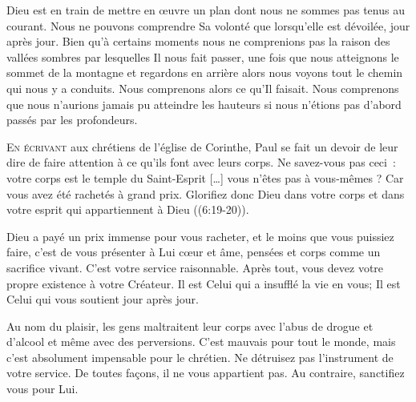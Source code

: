 Dieu est en train de mettre en \oe{}uvre un plan dont nous ne sommes
 pas tenus au courant. Nous ne pouvons comprendre Sa volonté
 que lorsqu'elle est dévoilée, jour après jour.
 Bien qu'à certains moments nous ne comprenions pas la raison
 des vallées sombres par lesquelles Il nous fait passer,
 une fois que nous atteignons le sommet de la montagne
 et regardons en arrière alors nous voyons tout le chemin
 qui nous y a conduits. Nous comprenons alors ce qu'Il faisait.
 Nous comprenons que nous n'aurions jamais pu atteindre
 les hauteurs si nous n'étions pas d'abord passés par les profondeurs.

\dvrule






\lettrine{E}{n écrivant} aux chrétiens de l'église de Corinthe,
 Paul se fait un devoir de leur dire de faire attention à ce qu'ils
 font avec leurs corps.
 \og Ne savez-vous pas ceci~: votre corps est le temple du Saint-Esprit
 [\dots{}] vous n'êtes pas à vous-mêmes ?
 Car vous avez été rachetés à grand prix. Glorifiez donc Dieu
 dans votre corps et dans votre esprit qui appartiennent à Dieu \fg{}
 ((6:19-20)).

Dieu a payé un prix immense pour vous racheter,
 et le moins que vous puissiez faire, c'est de vous présenter à Lui
 \ocadr c\oe{}ur et âme, pensées et corps \fcadr{} comme un sacrifice vivant.
 C'est votre service raisonnable. Après tout, vous devez votre propre
 existence à votre Créateur. Il est Celui qui a insufflé la vie en vous;
 Il est Celui qui vous soutient jour après jour.


Au nom du plaisir, les gens maltraitent leur corps avec l'abus de drogue
 et d'alcool et même avec des perversions. C'est mauvais pour tout le monde,
 mais c'est absolument impensable pour le chrétien.
 Ne détruisez pas l'instrument de votre service. De toutes façons,
 il ne vous appartient pas. Au contraire, sanctifiez vous pour Lui.

